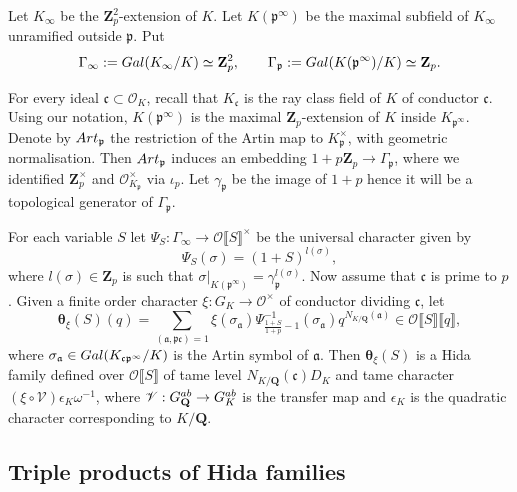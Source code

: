 \documentclass[10pt,letterpaper]{amsart}
\theoremstyle{plain}
\theoremstyle{definition}
\theoremstyle{definition}
\theoremstyle{plain}
\theoremstyle{plain}
\theoremstyle{plain}
\theoremstyle{remark}
\numberwithin{equation}{section}
\newcommand{\ch}{\xi}
\newcommand{\pp}{\mathfrak{p}}
\newcommand{\fa}{\mathfrak{a}}
\def\cO{\mathcal O}
\newcommand{\Q}{\mathbf{Q}}
\newcommand{\Z}{\mathbf{Z}}
\newcommand{\dBr}[1]{\llbracket{#1}\rrbracket}
\begin{document}
Let $K_\infty$ be the $\Z_p^2$-extension of $K$. Let $K({\pp^\infty})$ be the maximal subfield of $K_\infty$ unramified outside $\pp$. Put 
\[
\Gamma_\infty:={\rm Gal}(K_\infty/K)\simeq\Z_p^2,\quad\quad
\Gamma_{\pp}:={\rm Gal}(K({\pp^\infty})/K)\simeq\Z_p.
\]

For every ideal $\mathfrak{c}\subset\cO_K$, recall that $K_\mathfrak{c}$ is the ray class field of $K$ of conductor $\mathfrak{c}$. Using our notation, $K({\pp^\infty})$ is the maximal $\Z_p$-extension of $K$ inside $K_{\pp^\infty}$. Denote by ${\rm Art}_\pp$ the restriction of the Artin map to $K_\pp^\times$, with geometric normalisation. Then ${\rm Art}_\pp$ induces an embedding $1+p\Z_p\rightarrow\Gamma_{\pp}$, where we identified $\Z_p^\times$ and $\cO_{K_\pp}^\times$ via $\iota_p$. Let $\gamma_\pp$ be the image of $1+p$ hence it will be a topological generator of $\Gamma_{\pp}$.  %

For each variable $S$ let $\Psi_S:\Gamma_\infty\rightarrow\cO\dBr{S}^\times$ be the universal character %
given by
\[
\Psi_S(\sigma)=(1+S)^{l(\sigma)},
\]
where $l(\sigma)\in\Z_p$ is such that $\sigma\vert_{K({\pp^\infty})}=\gamma_\pp^{l(\sigma)}$. %
Now assume that $\mathfrak{c}$ is prime to $p$. Given a finite order character $\ch:G_K\rightarrow\cO^\times$ of conductor dividing $\mathfrak{c}$, let
\[
\boldsymbol{\theta}_\ch(S)(q)=\sum_{(\fa,\pp\mathfrak{c})=1}\ch(\sigma_{\fa})\Psi^{-1}_{\frac{1+S}{1+p}-1}(\sigma_\fa)q^{N_{K/\Q}(\fa)}\in\cO\dBr{S}\dBr{q},
\]
where $\sigma_\fa\in{\rm Gal}(K_{\mathfrak{c}\pp^\infty}/K)$ is the Artin symbol of $\fa$. 
Then $\boldsymbol{\theta}_\ch(S)$ is a Hida family  defined over $\cO\dBr{S}$ of tame level $N_{K/\Q}(\mathfrak{c})D_K$ and tame character $(\ch\circ\mathscr{V})\epsilon_{K}\omega^{-1}$, where $\mathscr{V}:G_\Q^{\rm ab}\rightarrow G_K^{\rm ab}$ is the transfer map and $\epsilon_{K}$ is the quadratic character corresponding to $K/\Q$. 


\subsection{Triple products of Hida families}\label{subsubsec:triple-hida}
\end{document}
